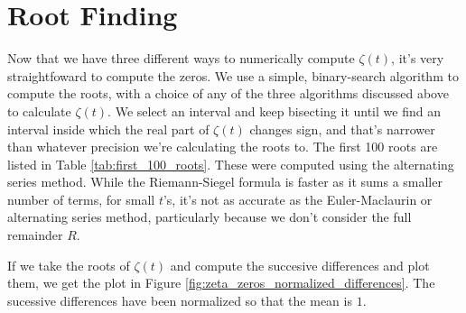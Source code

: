 \documentclass{amsproc}
\theoremstyle{definition}
\theoremstyle{remark}
\numberwithin{equation}{section}
\begin{document}
\section{Root Finding}
Now that we have three different ways to numerically compute $\zeta(t)$, it's very straightfoward to compute the zeros. We use a simple, binary-search algorithm to compute the roots, with a choice of any of the three algorithms discussed above to calculate $\zeta(t)$. We select an interval and keep bisecting it until we find an interval inside which the real part of $\zeta(t)$ changes sign, and that's narrower than whatever precision we're calculating the roots to. The first 100 roots are listed in Table \ref{tab:first_100_roots}. These were computed using the alternating series method. While the Riemann-Siegel formula is faster as it sums a smaller number of terms, for small $t$'s, it's not as accurate as the Euler-Maclaurin or alternating series method, particularly because we don't consider the full remainder $R$.

If we take the roots of $\zeta(t)$ and compute the succesive differences and plot them, we get the plot in Figure \ref{fig:zeta_zeros_normalized_differences}. The sucessive differences have been normalized so that the mean is $1$.
\end{document}
